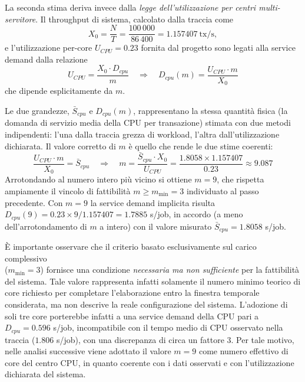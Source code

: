 \documentclass[11pt,a4paper]{article}
\begin{document}
La seconda stima deriva invece dalla \textit{legge dell'utilizzazione per centri multi-servitore}. Il
throughput di sistema, calcolato dalla traccia come
\begin{equation}
X_0 = \frac{N}{T} = \frac{100\,000}{86\,400} = 1.157407\ \text{tx/s},
\end{equation}
e l'utilizzazione per-core $U_{CPU}=0.23$ fornita dal progetto sono legati alla service demand
dalla relazione
\begin{equation}
U_{CPU} = \frac{X_0 \cdot D_{cpu}}{m} \quad\Longrightarrow\quad D_{cpu}(m) = \frac{U_{CPU}\cdot m}{X_0}
\end{equation}
che dipende esplicitamente da $m$.

Le due grandezze, $\bar S_{cpu}$ e $D_{cpu}(m)$, rappresentano la stessa quantità fisica (la domanda
di servizio media della CPU per transazione) stimata con due metodi indipendenti: l'una dalla
traccia grezza di workload, l'altra dall'utilizzazione dichiarata. Il valore corretto di $m$ è quello che rende le
due stime coerenti:
\begin{equation}
\frac{U_{CPU}\cdot m}{X_0} = \bar S_{cpu} \quad\Longrightarrow\quad
m = \frac{\bar S_{cpu}\cdot X_0}{U_{CPU}} = \frac{1.8058 \times 1.157407}{0.23} \approx 9.087
\end{equation}
Arrotondando al numero intero più vicino si ottiene $m=9$, che rispetta ampiamente il vincolo di
fattibilità $m \ge m_{\min}=3$ individuato al passo precedente. Con $m=9$ la service demand
implicita risulta $D_{cpu}(9) = 0.23\times 9/1.157407 = 1.7885$ s/job, in accordo (a meno
dell'arrotondamento di $m$ a intero) con il valore misurato $\bar S_{cpu}=1.8058$ s/job.

È importante osservare che il criterio basato esclusivamente sul carico complessivo \\($m_{\min}=3$)
fornisce una condizione \emph{necessaria ma non sufficiente} per la fattibilità del sistema. Tale
valore rappresenta infatti solamente il numero minimo teorico di core richiesto per completare
l'elaborazione entro la finestra temporale considerata, ma non descrive la reale configurazione del
sistema. L'adozione di soli tre core porterebbe infatti a una service demand della CPU pari a
$D_{cpu}=0.596$ s/job, incompatibile con il tempo medio di CPU osservato nella traccia
($1.806$ s/job), con una discrepanza di circa un fattore $3$. Per tale motivo, nelle analisi
successive viene adottato il valore $m=9$ come numero effettivo di core del centro CPU, in quanto
coerente con i dati osservati e con l'utilizzazione dichiarata del sistema.
\end{document}
